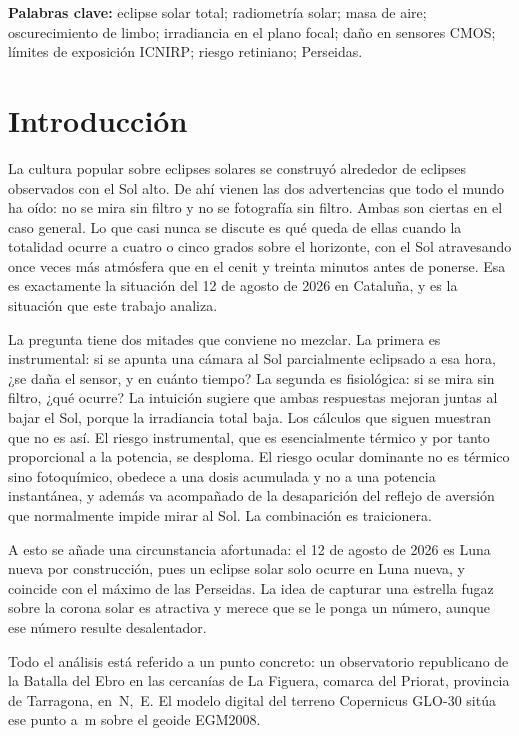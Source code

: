 \documentclass[10pt,a4paper]{article}
\begin{document}
\vspace{1mm}
\noindent\small\textbf{Palabras clave:} eclipse solar total; radiometría solar;
masa de aire; oscurecimiento de limbo; irradiancia en el plano focal; daño en
sensores CMOS; límites de exposición ICNIRP; riesgo retiniano; Perseidas.
\normalsize

\section{Introducción}

La cultura popular sobre eclipses solares se construyó alrededor de eclipses
observados con el Sol alto. De ahí vienen las dos advertencias que todo el mundo
ha oído: no se mira sin filtro y no se fotografía sin filtro. Ambas son ciertas
en el caso general. Lo que casi nunca se discute es qué queda de ellas cuando la
totalidad ocurre a cuatro o cinco grados sobre el horizonte, con el Sol
atravesando once veces más atmósfera que en el cenit y treinta minutos antes de
ponerse. Esa es exactamente la situación del 12 de agosto de 2026 en Cataluña, y
es la situación que este trabajo analiza.

La pregunta tiene dos mitades que conviene no mezclar. La primera es
instrumental: si se apunta una cámara al Sol parcialmente eclipsado a esa hora,
¿se daña el sensor, y en cuánto tiempo? La segunda es fisiológica: si se mira
sin filtro, ¿qué ocurre? La intuición sugiere que ambas respuestas mejoran
juntas al bajar el Sol, porque la irradiancia total baja. Los cálculos que
siguen muestran que no es así. El riesgo instrumental, que es esencialmente
térmico y por tanto proporcional a la potencia, se desploma. El riesgo ocular
dominante no es térmico sino fotoquímico, obedece a una dosis acumulada y no a
una potencia instantánea, y además va acompañado de la desaparición del reflejo
de aversión que normalmente impide mirar al Sol. La combinación es traicionera.

A esto se añade una circunstancia afortunada: el 12 de agosto de 2026 es Luna
nueva por construcción, pues un eclipse solar solo ocurre en Luna nueva, y
coincide con el máximo de las Perseidas. La idea de capturar una estrella fugaz
sobre la corona solar es atractiva y merece que se le ponga un número, aunque
ese número resulte desalentador.

Todo el análisis está referido a un punto concreto: un observatorio republicano
de la Batalla del Ebro en las cercanías de La Figuera, comarca del Priorat,
provincia de Tarragona, en \siteLat\textdegree{}\,N, \siteLon\textdegree{}\,E.
El modelo digital del terreno Copernicus GLO-30 sitúa ese punto a
\siteElevDEM\,m sobre el geoide EGM2008.
\end{document}
